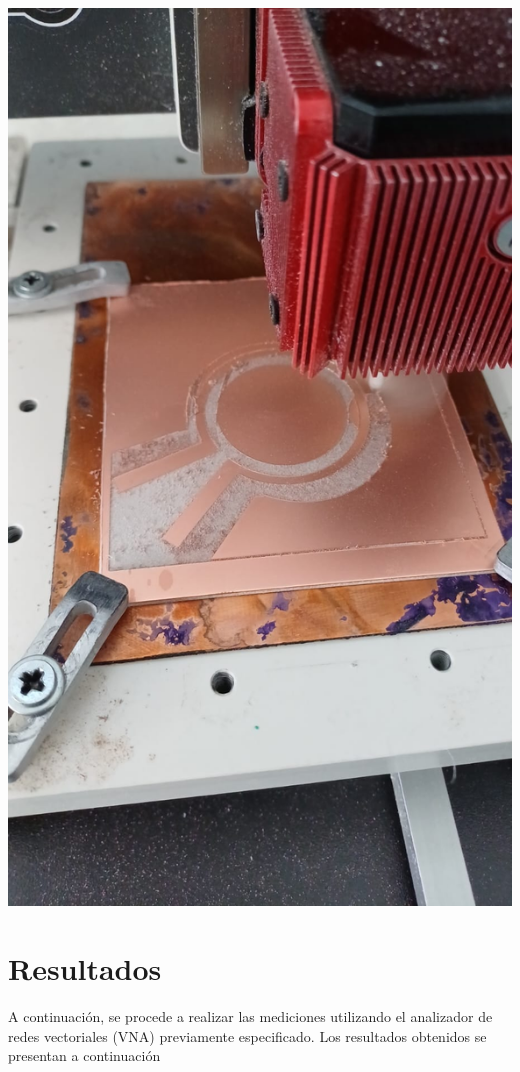 \documentclass[a4paper, 12pt]{article}
\begin{document}
\begin{minipage}{0.33\linewidth}
\includegraphics[width=0.99\linewidth]{./img/construccion2.jpg}
\end{minipage}

\section*{Resultados}
A continuación, se procede a realizar las mediciones utilizando el analizador de redes vectoriales (VNA) previamente especificado. Los resultados obtenidos se presentan a continuación
\end{document}

